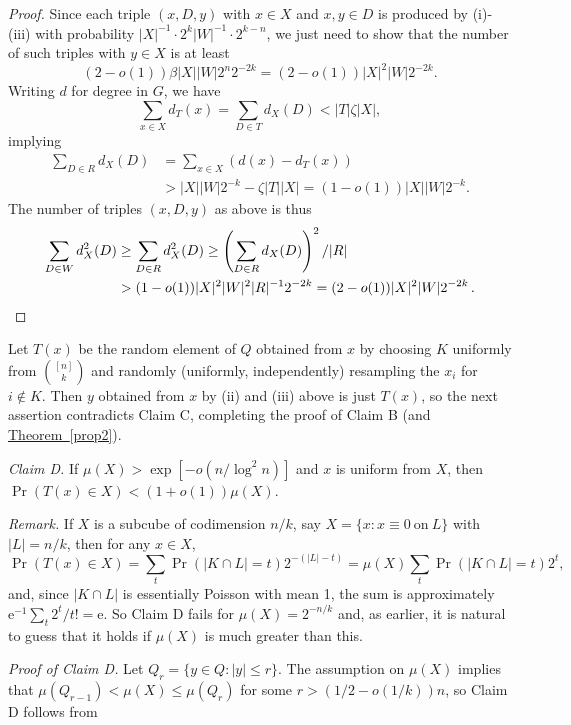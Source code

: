 \documentclass[11pt]{article}
\numberwithin{equation}{section}
\theoremstyle{definition}
\theoremstyle{plain}
\newcommand{\eee}{\mathrm e}
\newcommand{\expref}[2]{\hyperref[#2]{#1~\ref{#2}}}
\newcommand{\mn}[0]{\medskip\noindent}
\newcommand{\TTT}[0]{R}
\newcommand{\SSS}[0]{T}
\newcommand{\0}[0]{\emptyset}
\newcommand{\gb}[0]{\beta }
\newcommand{\gz}[0]{\zeta}
\begin{document}
\mn
\begin{proof}   %
%
Since each triple $(x,D,y)$ with $x\in X$ and $x,y\in D$ is
produced by (i)-(iii) with probability
$|X|^{-1}\cdot 2^k|W|^{-1}\cdot 2^{k-n}$,
we just need to show that the number of such triples with
$y\in X$ is at least
$$
(2-o(1))\gb |X||W|2^n2^{-2k}  = (2-o(1))|X|^2|W|2^{-2k}.
$$
Writing $d$ for degree in $G$, we have
$$
\sum_{x\in X}d_\SSS(x) =\sum_{D\in \SSS }d_X(D) < |\SSS |\gz
 |X|,
$$
implying
%
\begin{align*}
\sum_{D\in \TTT }d_X(D)& = 
\sum_{x\in X}(d(x)-d_\SSS (x))\\
&> |X||W|2^{-k} - \gz |\SSS ||X| = (1-o(1))|X||W|2^{-k}.
\end{align*}   %
The number of %
triples $(x,D,y)$  %
as above is thus
%
\begin{align*}
\sum_{D\in W} d_X^2(D)
&\geq
\sum_{D\in \TTT } d_X^2(D)
\geq
\left(\sum_{D\in \TTT } d_X(D)\right)^2/|\TTT |\\   %
&> (1-o(1))|X|^2|W|^2|\TTT |^{-1}2^{-2k}
= (2-o(1))|X|^2|W|2^{-2k}\,.
 \qedhere                          
\end{align*}   %
%
\end{proof}   %

Let $T(x)$ be
the random element of $Q$ %
obtained %
from $x$
by choosing $K$ uniformly from $\binom{[n]}{k}$ and
randomly (uniformly, independently) 
resampling %
the %
$x_i$  %
%
%
%
for $i\not\in K$.    %
Then $y$ %
obtained  %
from $x$ by (ii) and (iii) above is just $T(x)$,
so
the next assertion contradicts Claim C, completing the proof of
Claim B (and \expref{Theorem}{prop2}).



\mn
\emph{Claim D.}
If $\mu(X) > \exp[-o(n/\log^2n)]$
and $x$ is uniform from $X$, then $\Pr(T(x)\in X) < (1+o(1))\mu(X)$.

\mn
\emph{Remark.}
If $X$ is a subcube of codimension $n/k$, say
$X=\{x:x \equiv 0 ~\mbox{on}~L\}$ with $|L |=n/k$,
then for any $x\in X$,
$$
\Pr(T(x)\in X) =\sum_t\Pr(|K\cap L |=t)2^{-(|L|-t)}
=\mu(X)\sum_t\Pr(|K\cap L |=t)2^t,
$$
and, since $|K\cap L|$ is essentially Poisson with mean 1,
the sum is
approximately
$ \eee^{-1}\sum_t2^t/t! = \eee$.
So Claim D fails for $\mu(X) = 2^{-n/k}$ and, as earlier,
it is %
natural to guess that it holds if $\mu(X)$ is much
%
greater  %
than this.

\mn
\emph{Proof of Claim D.}
Let $Q_r=\{y\in Q:|y|\leq r\}$.
The assumption on $\mu(X)$ implies that
$\mu(Q_{r-1})<\mu(X) \leq \mu(Q_r)$
for some $r >(1/2-o(1/k))n$, so Claim D follows from
\end{document}
